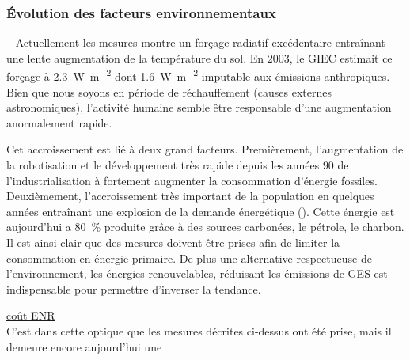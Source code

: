 \subsubsection{Évolution des facteurs environnementaux} %
\label{ssub:evolution_des_facteurs_environnementaux}
~
Actuellement les mesures montre un forçage radiatif excédentaire entraînant une
lente augmentation de la température du sol. En $2003$, le GIEC estimait ce forçage
à \SI{2.3}{\watt\per\metre\squared} dont \SI{1.6}{\watt\per\metre\squared} imputable
aux émissions anthropiques. Bien que nous soyons en période de réchauffement
(causes externes astronomiques), l’activité humaine semble être responsable d’une
augmentation anormalement rapide.


Cet accroissement est lié à deux grand facteurs. Premièrement, l’augmentation de la robotisation
et le développement très rapide depuis les années $90$ de l’industrialisation à fortement
augmenter la consommation d’énergie fossiles. Deuxièmement, l’accroissement très important
de la population en quelques années entraînant une explosion de la demande énergétique
(). Cette énergie est aujourd’hui a \SI{80}{\percent} produite grâce à des sources
carbonées, le pétrole, le charbon. Il est ainsi clair que des mesures doivent être
prises afin de limiter la consommation en énergie primaire. De plus une alternative
respectueuse de l’environnement, les énergies renouvelables, réduisant les émissions de
GES est indispensable pour permettre d’inverser la tendance.

\href{http://decrypterlenergie.org/les-energies-renouvelables-coutent-elles-trop-cher}{coût ENR}\\
C’est dans cette optique que les mesures décrites ci-dessus ont été prise, mais
il demeure encore aujourd’hui une






